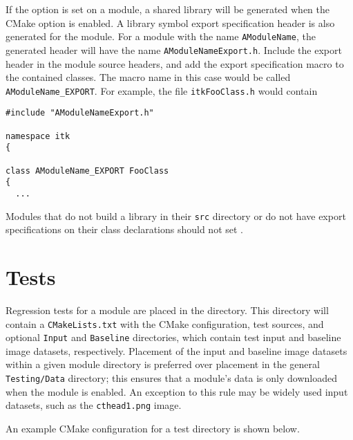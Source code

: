 If the  option is set on a
module, a shared library will be generated when
the CMake option  is enabled.  A library symbol
export specification header is also generated for the module.  For a module
with the name \texttt{AModuleName}, the generated header will have the name
\texttt{AModuleNameExport.h}. Include the export header in the module source
headers, and add the export specification macro to the contained classes.  The
macro name in this case would be called \texttt{AModuleName\_EXPORT}. For
example, the file \texttt{itkFooClass.h} would contain

\begin{verbatim}
#include "AModuleNameExport.h"

namespace itk
{

class AModuleName_EXPORT FooClass
{
  ...
\end{verbatim}

Modules that do not build a library in their \texttt{src} directory or do not
have export specifications on their class declarations should not set
.


\section{Tests}
\label{sec:Tests}

Regression tests for a module are placed in the  directory. This
directory will contain a \texttt{CMakeLists.txt} with the CMake configuration,
test sources, and optional \texttt{Input} and \texttt{Baseline} directories,
which contain test input and baseline image datasets, respectively. Placement
of the input and baseline image datasets within a given module directory is
preferred over placement in the general \texttt{Testing/Data} directory; this
ensures that a module's data is only downloaded when the module is enabled. An
exception to this rule may be widely used input datasets, such as the
\texttt{cthead1.png} image.

An example CMake configuration for a test directory is shown below.


